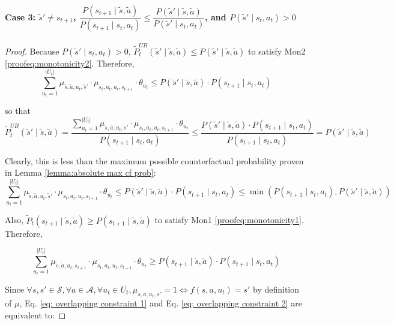 \pagebreak
\paragraph{Case 3: $\tilde{s}' \neq s_{t+1}$, $\dfrac{P(s_{t+1} \mid \tilde{s}, \tilde{a})}{P(s_{t+1} \mid s_t, a_t)}\leq\dfrac{P(\tilde{s}' \mid \tilde{s}, \tilde{a})}{P(\tilde{s}' \mid s_t, a_t)}$, and $P(\tilde{s}' \mid s_t, a_t) >0$}
\noindent
\begin{proof}
Because $P(\tilde{s}' \mid s_t, a_t) >0$, $\tilde{P}_{t}^{UB}(\tilde{s}' \mid \tilde{s}, \tilde{a}) \leq P(\tilde{s}' \mid \tilde{s}, \tilde{a})$ to satisfy Mon2 \eqref{proofeq:monotonicity2}. Therefore,
\begin{equation}
\label{eq: overlapping constraint 1}
\sum_{u_t = 1}^{|U_t|} \mu_{\tilde{s}, \tilde{a}, u_t, \tilde{s}'} \cdot \mu_{s_t, a_t, u_t, s_{t+1}} \cdot \theta_{u_t} \leq P(\tilde{s}' \mid \tilde{s}, \tilde{a}) \cdot P(s_{t+1} \mid s_t, a_t) 
\end{equation}

so that \[\tilde{P}_{t}^{UB}(\tilde{s}' \mid \tilde{s}, \tilde{a}) = \dfrac{\sum_{u_t = 1}^{|U_t|} \mu_{\tilde{s}, \tilde{a}, u_t, \tilde{s}'} \cdot \mu_{s_t, a_t, u_t, s_{t+1}} \cdot \theta_{u_t}}{P(s_{t+1} \mid s_t, a_t)} \leq \dfrac{P(\tilde{s}' \mid \tilde{s}, \tilde{a}) \cdot P(s_{t+1} \mid s_t, a_t)}{P(s_{t+1} \mid s_t, a_t)} = P(\tilde{s}' \mid \tilde{s}, \tilde{a})\]

Clearly, this is less than the maximum possible counterfactual probability proven in Lemma \ref{lemma:absolute max cf prob}: \[\sum_{u_t = 1}^{|U_t|} \mu_{\tilde{s}, \tilde{a}, u_t, \tilde{s}'} \cdot \mu_{s_t, a_t, u_t, s_{t+1}} \cdot \theta_{u_t} \leq P(\tilde{s}' \mid \tilde{s}, \tilde{a}) \cdot P(s_{t+1} \mid s_t, a_t) \leq \min\left(P(s_{t+1} \mid s_t, a_t), P(\tilde{s}' \mid \tilde{s}, \tilde{a})\right)\]

Also, $\tilde{P}_t(s_{t+1} \mid \tilde{s}, \tilde{a}) \geq P(s_{t+1} \mid \tilde{s}, \tilde{a})$ to satisfy Mon1 \eqref{proofeq:monotonicity1}. Therefore,

\begin{equation}
\label{eq: overlapping constraint 2}
\sum_{u_t = 1}^{|U_t|} \mu_{\tilde{s}, \tilde{a}, u_t, s_{t+1}} \cdot \mu_{s_t, a_t, u_t, s_{t+1}} \cdot \theta_{u_t} \geq P(s_{t+1} \mid \tilde{s}, \tilde{a}) \cdot P(s_{t+1} \mid s_t, a_t)    
\end{equation}

Since $\forall s,s' \in \mathcal{S}, \forall a \in \mathcal{A}, \forall u_t \in U_t, \mu_{s, a, u_t, s'} = 1 \iff f(s, a, u_t) = s'$ by definition of $\mu$, Eq. \eqref{eq: overlapping constraint 1} and Eq. \eqref{eq: overlapping constraint 2} are equivalent to:


\end{proof}
